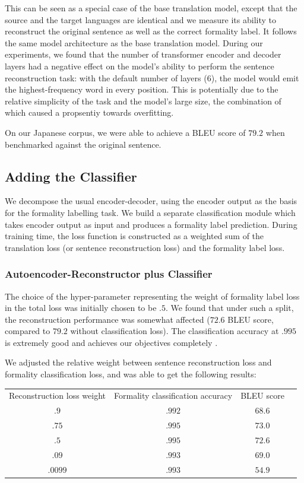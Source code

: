 \documentclass[11pt]{article}
\begin{document}
This can be seen as a special case of the base translation model, except that the source and the target languages are identical and we measure its ability to reconstruct the original sentence as well as the correct formality label. It follows the same model architecture as the base translation model. During our experiments, we found that the number of transformer encoder and decoder layers had a negative effect on the model's ability to perform the sentence reconstruction task: with the default number of layers ($6$), the model would emit the highest-frequency word in every position. This is potentially due to the relative simplicity of the task and the model's large size, the combination of which caused a propsentiy towards overfitting.

On our Japanese corpus, we were able to achieve a BLEU score of $79.2$ when benchmarked against the original sentence.

\subsection{Adding the Classifier}

We decompose the usual encoder-decoder, using the encoder output as the basis for the formality labelling task. We build a separate classification module which takes encoder output as input and produces a formality label prediction. During training time, the loss function is constructed as a weighted sum of the translation loss (or sentence reconstruction loss) and the formality label loss.

\subsubsection{Autoencoder-Reconstructor plus Classifier}

The choice of the hyper-parameter representing the weight of formality label loss in the total loss was initially chosen to be $.5$. We found that under such a split, the reconstruction performance was somewhat affected ($72.6$ BLEU score, compared to $79.2$ without classification loss). The classification accuracy at $.995$ is extremely good and achieves our objectives completely .

We adjusted the relative weight between sentence reconstruction loss and formality classification loss, and was able to get the following results:

\begin{tabular}{ c c c c }
    Reconstruction loss weight & Formality classification accuracy & BLEU score \\
    $.9$ & $.992$ & $68.6$ \\
    $.75$ & $.995$ & $73.0$ \\
    $.5$ & $.995$ & $72.6$ \\
    $.09$ & $.993$ & $69.0$ \\
    $.0099$ & $.993$ & $54.9$ \\
\end{tabular}
\end{document}
